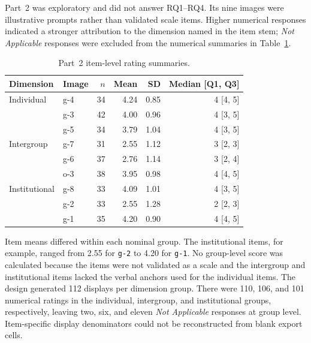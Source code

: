 Part~2 was exploratory and did not answer RQ1--RQ4. Its nine images were
illustrative prompts rather than validated scale items. Higher numerical
responses indicated a stronger attribution to the dimension named in the item
stem; \textit{Not Applicable} responses were excluded from the numerical
summaries in Table~\ref{tab:part2_items}.

\begin{table}[htbp]
    \centering
    \caption{Part~2 item-level rating summaries.}
    \label{tab:part2_items}
    \small
    \begin{tabular}{llrrrr}
        \toprule
        Dimension & Image & \(n\) & Mean & SD & Median [Q1, Q3] \\
        \midrule
        Individual & g-4 & 34 & 4.24 & 0.85 & 4 [4, 5] \\
                   & g-3 & 42 & 4.00 & 0.96 & 4 [3, 5] \\
                   & g-5 & 34 & 3.79 & 1.04 & 4 [3, 5] \\
        \addlinespace
        Intergroup & g-7 & 31 & 2.55 & 1.12 & 3 [2, 3] \\
                   & g-6 & 37 & 2.76 & 1.14 & 3 [2, 4] \\
                   & o-3 & 38 & 3.95 & 0.98 & 4 [4, 5] \\
        \addlinespace
        Institutional & g-8 & 33 & 4.09 & 1.01 & 4 [3, 5] \\
                      & g-2 & 33 & 2.55 & 1.28 & 2 [2, 3] \\
                      & g-1 & 35 & 4.20 & 0.90 & 4 [4, 5] \\
        \bottomrule
    \end{tabular}
\end{table}

\FloatBarrier

Item means differed within each nominal group. The institutional items, for
example, ranged from 2.55 for \texttt{g-2} to 4.20 for \texttt{g-1}. No
group-level score was calculated because the items were not validated as a
scale and the intergroup and institutional items lacked the verbal anchors used
for the individual items. The design generated 112 displays per dimension
group. There were 110, 106, and 101 numerical ratings in the individual,
intergroup, and institutional groups, respectively, leaving two, six, and
eleven \textit{Not Applicable} responses at group level. Item-specific display
denominators could not be reconstructed from blank export cells.


